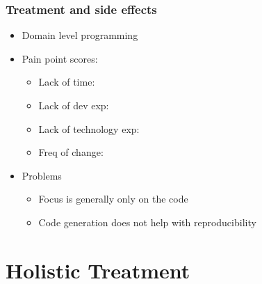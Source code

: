 \documentclass[usenames,dvipsnames]{beamer}
\newcommand{\cross}{{\LARGE {\color{red}\ding{55}}}}
\newcommand{\greencheck}{{\LARGE {\color{ForestGreen}\checkmark}}}
\begin{document}

\begin{frame}

  \frametitle{Treatment and side effects}

  \begin{itemize}
  \item Domain level programming
  \item Pain point scores:
  \begin{itemize}
    \item Lack of time: \greencheck %
    \item Lack of dev exp: \greencheck %
    \item Lack of technology exp: \cross %
    \item Freq of change: \greencheck %
  \end{itemize}
  \item Problems
  \begin{itemize}
    \item Focus is generally only on the code
    \item Code generation does not help with reproducibility
  \end{itemize}
\end{itemize}

\end{frame}
  

\section[Holistic]{Holistic Treatment}

\end{document}
